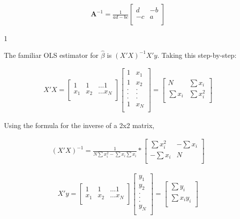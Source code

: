 \documentclass[12pt,letterpaper]{article}
\newcommand{\solutions}{0}
\begin{document}
\begin{eqnarray*}
\mathbf{A}^{-1} = \frac{1}{ad-bc}\begin{bmatrix} 
d &-b\\
-c& a\\
\end{bmatrix} 
\end{eqnarray*}

\bigskip
\if\solutions1
{\color{red}

The familiar OLS estimator for $\hat{\beta}$ is $(X'X)^{-1}X'y$. Taking this step-by-step:

\begin{eqnarray*}
X'X=
\begin{bmatrix} 
1 &1& \ldots 1\\
x_1& x_2& \ldots x_N\\
\end{bmatrix}
\begin{bmatrix}  
1 & x_1 \\
1 & x_2 \\
.& . \\
.& . \\
.& . \\
1& x_N \\
\end{bmatrix}
=
\begin{bmatrix} 
N & \sum x_i \\
\sum x_i & \sum x_i^2 \\
\end{bmatrix}
\end{eqnarray*}

Using the formula for the inverse of a 2x2 matrix, 

\begin{eqnarray*}
(X'X)^{-1}= \frac{1}{N \sum x_i^2 - \sum x_i \sum x_i} *
\begin{bmatrix} 
 \sum x_i^2& -\sum x_i \\
-\sum x_i & N\\
\end{bmatrix}
\end{eqnarray*}

\begin{eqnarray*}
X'y=
\begin{bmatrix} 
1 &1& \ldots 1\\
x_1& x_2& \ldots x_N\\
\end{bmatrix}
\begin{bmatrix}  
y_1 \\
y_2 \\
. \\
. \\
. \\
y_N \\
\end{bmatrix}
=
\begin{bmatrix} 
 \sum y_i \\
\sum x_i y_i \\
\end{bmatrix}
\end{eqnarray*}

}
\end{document}

